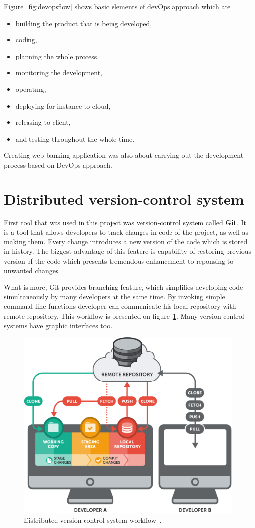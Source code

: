 \documentclass[a4paper,12pt]{book}
\newcommand\tab[1][1cm]{\hspace*{#1}}
\begin{document}
{{Figure~\ref{fig:devopsflow} shows basic elements of devOps approach which are
\begin{itemize}
	\item building the product that is being developed,
	\item coding,
	\item planning the whole process,
	\item monitoring the development,
	\item operating,
	\item deploying for instance to cloud,
	\item releasing to client,
	\item and testing throughout the whole time.
\end{itemize} 
	
\bigskip
Creating web banking application was also about carrying out the development process based on DevOps approach. 
}
\section{Distributed version-control system}}
{
\tab First tool that was used in this project was version-control system called \textbf{Git}. It is a tool that allows developers to track changes in code of the project, as well as making them. Every change introduces a new version of the code which is stored in history. The biggest advantage of this feature is capability of restoring previous version of the code which presents tremendous enhancement to reponsing to unwanted changes.

\bigskip
What is more, Git provides branching feature, which simplifies developing code simultaneously by many developers at the same time. By invoking simple command line functions developer can communicate his local repository with remote repository. This workflow is presented on figure~\ref{fig:vcflow}. Many version-control systems have graphic interfaces too.

\bigskip
\begin{figure}[H]
  \centering
    \includegraphics[width=1.0\textwidth]{git}
    \caption{Distributed version-control system workflow~\cite{git}.}
    \label{fig:vcflow}
\end{figure}   
}
\end{document}
